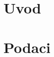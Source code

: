 \documentclass[12pt,oneside]{memoir}
\begin{document}
\frontmatter
\naslovna
\komisija
\tableofcontents*

\mainmatter


\chapter{Uvod}



\chapter{Podaci}
\end{document}
